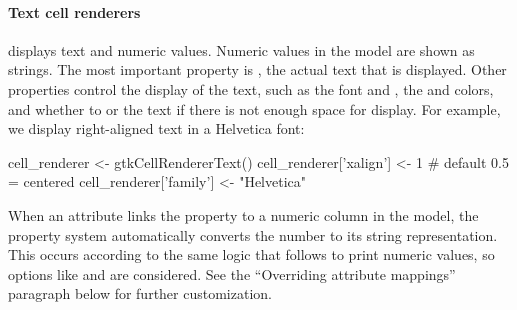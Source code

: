 \paragraph{Text cell renderers}

 displays text and numeric
values. Numeric values in the model are shown as strings.  The most
important property is , the actual text that is
displayed. Other properties control the display of the text, such as
the font  and , the  and
 colors, and whether to  or
 the text if there is not enough space for display.  For
example, we display right-aligned text in a Helvetica font:
\begin{Schunk}
\begin{Sinput}
 cell_renderer <- gtkCellRendererText()
 cell_renderer['xalign'] <- 1          # default 0.5 = centered
 cell_renderer['family'] <- "Helvetica"  
\end{Sinput}
\end{Schunk}

When an attribute links the  property to a numeric column
in the model, the property system automatically converts the number to
its string representation. This occurs according to the same logic
that \R\/ follows to print numeric values, so options like
 and  are considered. See the ``Overriding
attribute mappings'' paragraph below for further customization.

